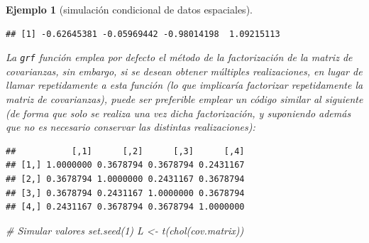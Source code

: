 \documentclass[
]{book}
\newenvironment{Shaded}{\begin{snugshade}}{\end{snugshade}}
\newcommand{\AttributeTok}[1]{\textcolor[rgb]{0.77,0.63,0.00}{#1}}
\newcommand{\CommentTok}[1]{\textcolor[rgb]{0.56,0.35,0.01}{\textit{#1}}}
\newcommand{\DecValTok}[1]{\textcolor[rgb]{0.00,0.00,0.81}{#1}}
\newcommand{\FunctionTok}[1]{\textcolor[rgb]{0.00,0.00,0.00}{#1}}
\newcommand{\NormalTok}[1]{#1}
\newcommand{\OtherTok}[1]{\textcolor[rgb]{0.56,0.35,0.01}{#1}}
\newcommand{\SpecialCharTok}[1]{\textcolor[rgb]{0.00,0.00,0.00}{#1}}
\theoremstyle{break}
\newtheorem{example}{Ejemplo}[chapter]
\theoremstyle{nonumberplain}
\begin{document}
\begin{example}[simulación condicional de datos espaciales]
\begin{verbatim}
## [1] -0.62645381 -0.05969442 -0.98014198  1.09215113
\end{verbatim}

La \texttt{grf} función emplea por defecto el método de la factorización de la matriz de covarianzas,
sin embargo, si se desean obtener múltiples realizaciones, en lugar de llamar repetidamente a esta función (lo que implicaría factorizar repetidamente la matriz de covarianzas),
puede ser preferible emplear un código similar al siguiente (de forma que solo se realiza una vez dicha factorización, y suponiendo además que no es necesario conservar las distintas realizaciones):

\begin{Shaded}
\end{Shaded}

\begin{verbatim}
##           [,1]      [,2]      [,3]      [,4]
## [1,] 1.0000000 0.3678794 0.3678794 0.2431167
## [2,] 0.3678794 1.0000000 0.2431167 0.3678794
## [3,] 0.3678794 0.2431167 1.0000000 0.3678794
## [4,] 0.2431167 0.3678794 0.3678794 1.0000000
\end{verbatim}

\begin{Shaded}
\begin{Highlighting}[]
\CommentTok{\# Simular valores}
\FunctionTok{set.seed}\NormalTok{(}\DecValTok{1}\NormalTok{)}
\NormalTok{L }\OtherTok{\textless{}{-}} \FunctionTok{t}\NormalTok{(}\FunctionTok{chol}\NormalTok{(cov.matrix))}


\end{Highlighting}
\end{Shaded}
\end{example}
\end{document}
